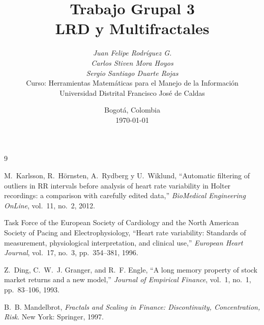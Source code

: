\documentclass[11pt,a4paper]{article}
\title{%
    \textbf{Trabajo Grupal 3}\\[4pt]
    \large LRD y Multifractales
    \vspace{2em}
}
\author{%
    \textit{Juan Felipe Rodríguez G.} \quad 20261595004 \\
    \textit{Carlos Stiven Mora Hoyos} \quad 20261595003 \\
    \vspace{3em}
    \textit{Sergio Santiago Duarte Rojas} \quad 20261595002 \\[6pt]
    \vspace{1em}
    Curso: Herramientas Matemáticas para el Manejo de la Información\\
    \vspace{1em}
    Universidad Distrital Francisco José de Caldas
    \vspace{1em}
}
\date{Bogotá, Colombia \\ \today}
\theoremstyle{definition}
\theoremstyle{plain}
\theoremstyle{remark}
\begin{document}
\maketitle
\thispagestyle{fancy}

\clearpage
\tableofcontents
\clearpage















\begin{thebibliography}{9}

    M.~Karlsson, R.~Hörnsten, A.~Rydberg y U.~Wiklund,
    ``Automatic filtering of outliers in RR intervals before analysis of
    heart rate variability in Holter recordings: a comparison with carefully
    edited data,''
    \emph{BioMedical Engineering OnLine}, vol.~11, no.~2, 2012.

    Task Force of the European Society of Cardiology and the North American
    Society of Pacing and Electrophysiology,
    ``Heart rate variability: Standards of measurement, physiological
    interpretation, and clinical use,''
    \emph{European Heart Journal}, vol.~17, no.~3, pp.~354--381, 1996.

Z.~Ding, C.~W.~J. Granger, and R.~F. Engle, ``A long memory property of
stock market returns and a new model,''
\textit{Journal of Empirical Finance}, vol.~1, no.~1, pp.~83--106, 1993.

B.~B. Mandelbrot, \textit{Fractals and Scaling in Finance: Discontinuity,
Concentration, Risk}. New York: Springer, 1997.

\end{thebibliography}


\end{document}
